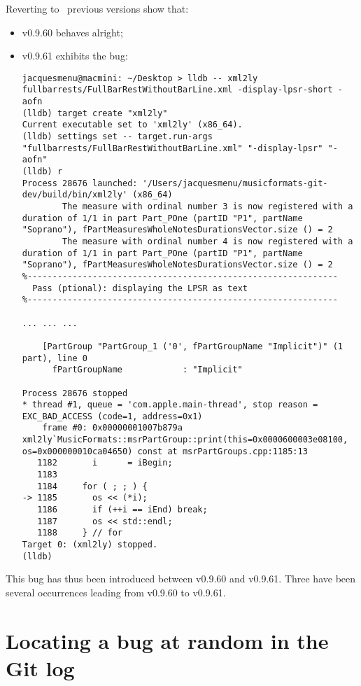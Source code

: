 Reverting to \mf\ previous versions show that:
\begin{itemize}
\item v0.9.60 behaves alright;
\item v0.9.61 exhibits the bug:

\begin{lstlisting}[language=Terminal]
jacquesmenu@macmini: ~/Desktop > lldb -- xml2ly  fullbarrests/FullBarRestWithoutBarLine.xml -display-lpsr-short -aofn
(lldb) target create "xml2ly"
Current executable set to 'xml2ly' (x86_64).
(lldb) settings set -- target.run-args  "fullbarrests/FullBarRestWithoutBarLine.xml" "-display-lpsr" "-aofn"
(lldb) r
Process 28676 launched: '/Users/jacquesmenu/musicformats-git-dev/build/bin/xml2ly' (x86_64)
        The measure with ordinal number 3 is now registered with a duration of 1/1 in part Part_POne (partID "P1", partName "Soprano"), fPartMeasuresWholeNotesDurationsVector.size () = 2
        The measure with ordinal number 4 is now registered with a duration of 1/1 in part Part_POne (partID "P1", partName "Soprano"), fPartMeasuresWholeNotesDurationsVector.size () = 2
%--------------------------------------------------------------
  Pass (ptional): displaying the LPSR as text
%--------------------------------------------------------------

... ... ...

    [PartGroup "PartGroup_1 ('0', fPartGroupName "Implicit")" (1 part), line 0
      fPartGroupName            : "Implicit"

Process 28676 stopped
* thread #1, queue = 'com.apple.main-thread', stop reason = EXC_BAD_ACCESS (code=1, address=0x1)
    frame #0: 0x00000001007b879a xml2ly`MusicFormats::msrPartGroup::print(this=0x0000600003e08100, os=0x000000010ca04650) const at msrPartGroups.cpp:1185:13
   1182	      i      = iBegin;
   1183
   1184	    for ( ; ; ) {
-> 1185	      os << (*i);
   1186	      if (++i == iEnd) break;
   1187	      os << std::endl;
   1188	    } // for
Target 0: (xml2ly) stopped.
(lldb)
\end{lstlisting}

\end{itemize}

This bug has thus been introduced between v0.9.60 and v0.9.61.
Three have been several  occurrences leading from v0.9.60 to v0.9.61.


\section{Locating a bug at random in the Git log}

